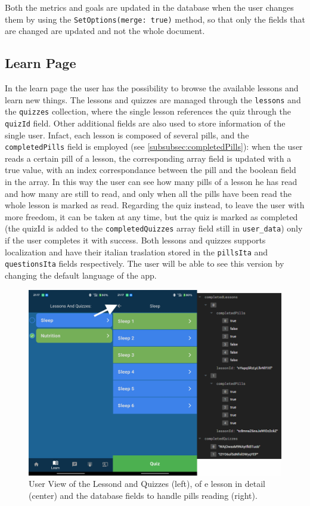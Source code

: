 \noindent Both the metrics and goals are updated in the database when the user changes them by using the \texttt{SetOptions(merge: true)} method, so that only the fields that are changed are updated and not the whole document.
\subsection{Learn Page}
In the learn page the user has the possibility to browse the available lessons and learn new things. The lessons and quizzes are managed through the \texttt{lessons} and the \texttt{quizzes} collection, where the single lesson references the quiz through the \texttt{quizId} field. Other additional fields are also used to store information of the single user. Infact, each lesson is composed of several pills, and the \texttt{completedPills} field is employed (see \cref{subsubsec:completedPills}): when the user reads a certain pill of a lesson, the corresponding array field is updated with a true value, with an index correspondance between the pill and the boolean field in the array. In this way the user can see how many pills of a lesson he has read and how many are still to read, and only when all the pills have been read the whole lesson is marked as read. Regarding the quiz instead, to leave the user with more freedom, it can be taken at any time, but the quiz is marked as completed (the quizId is added to the \texttt{completedQuizzes} array field still in \texttt{user\_data}) only if the user completes it with success. Both lessons and quizzes supports localization and have their italian traslation stored in the \texttt{pillsIta} and \texttt{questionsIta} fields respectively. The user will be able to see this version by changing the default language of the app.
\begin{figure}
    \centering
    \includegraphics[width=0.6\linewidth]{./images/lessonsQuizzes.jpg}
    \caption{User View of the Lessond and Quizzes (left), of e lesson in detail (center) and the database fields to handle pills reading (right).}
\end{figure}

